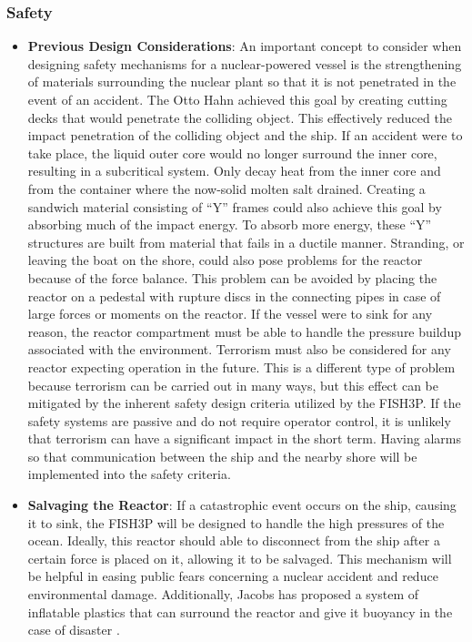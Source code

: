 \documentclass[12pt]{article}
\begin{document}
\subsubsection{Safety}
\begin{itemize}

\item \textbf{Previous Design Considerations}: \newline
An important concept to consider when designing safety mechanisms for a nuclear-powered vessel is the strengthening of materials surrounding the nuclear plant so that it is not penetrated in the event of an accident.  The Otto Hahn achieved this goal by creating cutting decks that would penetrate the colliding object.  This effectively reduced the impact penetration of the colliding object and the ship.  If an accident were to take place, the liquid outer core would no longer surround the inner core, resulting in a subcritical system.  Only decay heat from the inner core and from the container where the now-solid molten salt drained.  Creating a sandwich material consisting of “Y” frames could also achieve this goal by absorbing much of the impact energy.  To absorb more energy, these “Y” structures are built from material that fails in a ductile manner.  Stranding, or leaving the boat on the shore, could also pose problems for the reactor because of the force balance.  This problem can be avoided by placing the reactor on a pedestal with rupture discs in the connecting pipes in case of large forces or moments on the reactor.  If the vessel were to sink for any reason, the reactor compartment must be able to handle the pressure buildup associated with the environment.  Terrorism must also be considered for any reactor expecting operation in the future.  This is a different type of problem because terrorism can be carried out in many ways, but this effect can be mitigated by the inherent safety design criteria utilized by the FISH3P.  If the safety systems are passive and do not require operator control, it is unlikely that terrorism can have a significant impact in the short term.  Having alarms so that communication between the ship and the nearby shore will be implemented into the safety criteria.
\item \textbf{Salvaging the Reactor}: \newline
If a catastrophic event occurs on the ship, causing it to sink, the FISH3P will be designed to handle the high pressures of the ocean.  Ideally, this reactor should able to disconnect from the ship after a certain force is placed on it, allowing it to be salvaged.  This mechanism will be helpful in easing public fears concerning a nuclear accident and reduce environmental damage. Additionally, Jacobs has proposed a system of inflatable plastics that can surround the reactor and give it buoyancy in the case of disaster \cite{Jacobs}.


\end{itemize}
\end{document}
